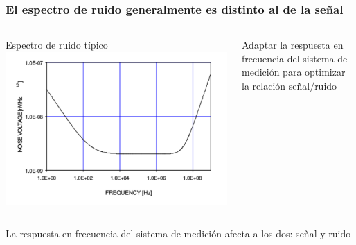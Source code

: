 \documentclass{beamer}
\begin{document}
\begin{frame}
\frametitle{\small{El espectro de ruido generalmente es distinto al de la
señal}}
\begin{columns}
\begin{column}{0.5\textwidth}
\begin{block}{\small{Espectro de ruido típico}}
\includegraphics[height=0.4\textheight,width=\textwidth]{d1/espectro_ruido_tipo}
\end{block}
\end{column}
\begin{column}{0.48\textwidth}
\begin{alertblock}{}
Adaptar la respuesta en frecuencia del sistema de medición para optimizar la
relación señal/ruido
\end{alertblock}
\end{column}
\end{columns}
\begin{block}{}
La respuesta en frecuencia del sistema de medición \alert{afecta a los dos}: señal y
ruido
\end{block}
\end{frame} 
\end{document}
